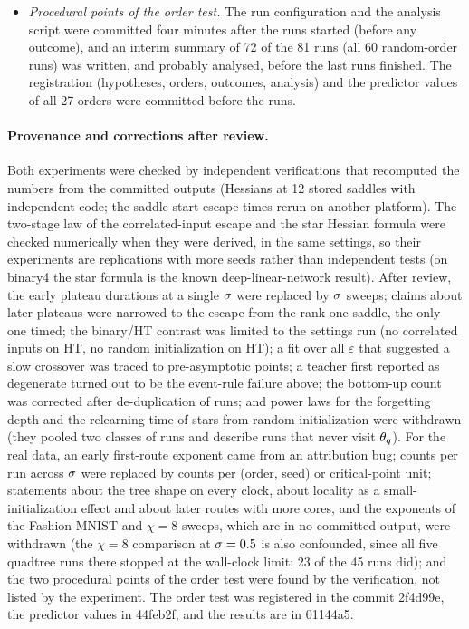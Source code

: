 \begin{itemize}
    small-initialization runs end below the floor of the linearized model for four of five seeds. From
    $\isc=2.8$ on the runs follow the linearized model to $5\cdot10^{-5}$ (at $\isc=2$ up to $1.5\%$, one run labelled
    rich); its tangent kernel has rank $304=\sum_v\fanin v\bd v-\sum_e\bd e^2$ of 528 parameters
    (\cref{prop:A-kernel}(c)).
  \item \emph{Procedural points of the order test.} The run configuration and the analysis script were
    committed four minutes after the runs started (before any outcome), and an interim summary of 72 of the
    81 runs (all 60 random-order runs) was written, and probably analysed, before the last runs finished.
    The registration (hypotheses, orders, outcomes, analysis) and the predictor values of all 27 orders
    were committed before the runs.
\end{itemize}

\paragraph{Provenance and corrections after review.}
Both experiments were checked by independent verifications that recomputed the numbers from the committed
outputs (Hessians at 12 stored saddles with independent code; the saddle-start escape times rerun on
another platform). The two-stage law of the correlated-input escape and the star Hessian formula were
checked numerically when they were derived, in the same settings, so their experiments are replications
with more seeds rather than independent tests (on binary4 the star formula is the known deep-linear-network
result). After review, the early plateau durations at a single $\sigma$ were replaced by $\sigma$ sweeps; claims
about later plateaus were narrowed to the escape from the rank-one saddle, the only one timed; the
binary/HT contrast was limited to the settings run (no correlated inputs on HT, no random initialization
on HT); a fit over all $\varepsilon$ that suggested a slow crossover was traced to pre-asymptotic points; a
teacher first reported as degenerate turned out to be the event-rule failure above; the bottom-up count
was corrected after de-duplication of runs; and power laws for the forgetting depth and the relearning
time of stars from random initialization were withdrawn (they pooled two classes of runs and describe runs
that never visit $\theta_q$). For the real data, an early first-route exponent came from an attribution bug;
counts per run across $\sigma$ were replaced by counts per (order, seed) or critical-point unit; statements
about the tree shape on every clock, about locality as a small-initialization effect and about later
routes with more cores, and the exponents of the Fashion-MNIST and $\chi=8$ sweeps, which are in no
committed output, were withdrawn (the $\chi=8$ comparison at $\sigma=0.5$ is also confounded, since all five
quadtree runs there stopped at the wall-clock limit; 23 of the 45 runs did); and the two procedural points
of the order test were found by the
verification, not listed by the experiment. The order test was registered in the commit 2f4d99e, the
predictor values in 44feb2f, and the results are in 01144a5.
